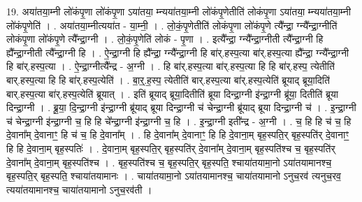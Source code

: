 \documentclass[17pt]{extarticle}
\begin{document}
19. अया॑तया॒म्नी लो॑कंपृ॒णा लो॑कंपृ॒णा ऽया॑तया॒ म्न्यया॑तया॒म्नी लो॑कंपृ॒णेतीति॑ लोकंपृ॒णा ऽया॑तया॒ म्न्यया॑तया॒म्नी लो॑कंपृ॒णेति॑ । . अया॑तया॒म्नीत्यया॑त - या॒म्नी॒ । . लो॒कं॒पृ॒णेतीति॑ लोकंपृ॒णा लो॑कंपृ॒णे त्यै᳚न्द्रा॒ ग्न्यै᳚न्द्रा॒ग्नीति॑ लोकंपृ॒णा लो॑कंपृ॒णे त्यै᳚न्द्रा॒ग्नी । . लो॒कं॒पृ॒णेति॑ लोकं - पृ॒णा । . इत्यै᳚न्द्रा॒ ग्न्यै᳚न्द्रा॒ग्नीती त्यै᳚न्द्रा॒ग्नी हि ह्यै᳚न्द्रा॒ग्नीती त्यै᳚न्द्रा॒ग्नी हि । . ऐ॒न्द्रा॒ग्नी हि ह्यै᳚न्द्रा॒ ग्न्यै᳚न्द्रा॒ग्नी हि बा॑र्.हस्प॒त्या बा॑र्.हस्प॒त्या ह्यै᳚न्द्रा॒ ग्न्यै᳚न्द्रा॒ग्नी हि बा॑र्.हस्प॒त्या । . ऐ॒न्द्रा॒ग्नीत्यै᳚न्द्र - अ॒ग्नी । . हि बा॑र्.हस्प॒त्या बा॑र्.हस्प॒त्या हि हि बा॑र्.हस्प॒ त्येतीति॑ बार्.हस्प॒त्या हि हि बा॑र्.हस्प॒त्येति॑ । . बा॒र्॒.ह॒स्प॒ त्येतीति॑ बार्.हस्प॒त्या बा॑र्.हस्प॒त्येति॑ ब्रूयाद् ब्रूया॒दिति॑ बार्.हस्प॒त्या बा॑र्.हस्प॒त्येति॑ ब्रूयात् । . इति॑ ब्रूयाद् ब्रूया॒दितीति॑ ब्रूया दिन्द्रा॒ग्नी इ॑न्द्रा॒ग्नी ब्रू॑या॒ दितीति॑ ब्रूया दिन्द्रा॒ग्नी । . ब्रू॒या॒ दि॒न्द्रा॒ग्नी इ॑न्द्रा॒ग्नी ब्रू॑याद् ब्रूया दिन्द्रा॒ग्नी च॑ चेन्द्रा॒ग्नी ब्रू॑याद् ब्रूया दिन्द्रा॒ग्नी च॑ । . इ॒न्द्रा॒ग्नी च॑ चेन्द्रा॒ग्नी इ॑न्द्रा॒ग्नी च॒ हि हि चे᳚न्द्रा॒ग्नी इ॑न्द्रा॒ग्नी च॒ हि । . इ॒न्द्रा॒ग्नी इती᳚न्द्र - अ॒ग्नी । . च॒ हि हि च॑ च॒ हि दे॒वाना᳚म् दे॒वानाꣳ॒॒ हि च॑ च॒ हि दे॒वाना᳚म् । . हि दे॒वाना᳚म् दे॒वानाꣳ॒॒ हि हि दे॒वाना॒म् बृह॒स्पति॒र् बृह॒स्पति॑र् दे॒वानाꣳ॒॒ हि हि दे॒वाना॒म् बृह॒स्पतिः॑ । . दे॒वाना॒म् बृह॒स्पति॒र् बृह॒स्पति॑र् दे॒वाना᳚म् दे॒वाना॒म् बृह॒स्पति॑श्च च॒ बृह॒स्पति॑र् दे॒वाना᳚म् दे॒वाना॒म् बृह॒स्पति॑श्च । . बृह॒स्पति॑श्च च॒ बृह॒स्पति॒र् बृह॒स्पति॒ श्चाया॑तयामा॒नो ऽया॑तयामानश्च॒ बृह॒स्पति॒र् बृह॒स्पति॒ श्चाया॑तयामानः । . चाया॑तयामा॒नो ऽया॑तयामानश्च॒ चाया॑तयामानो ऽनुच॒रव॑ त्यनुच॒रव॒ त्यया॑तयामानश्च॒ चाया॑तयामानो ऽनुच॒रव॑ती । \newline
\end{document}
